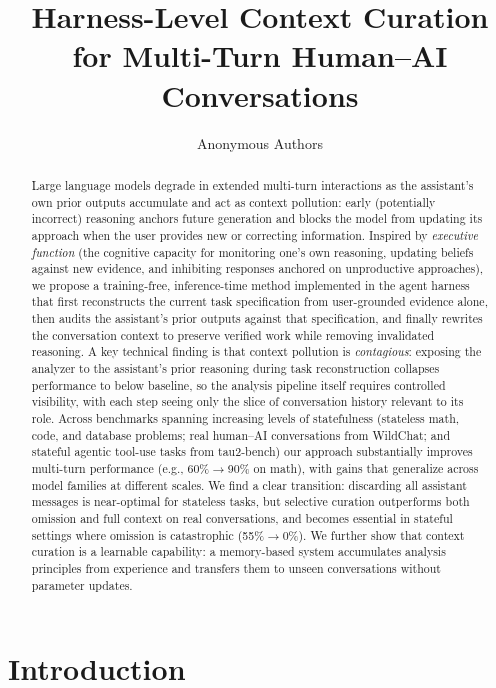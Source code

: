 \documentclass{article}
\title{Harness-Level Context Curation for Multi-Turn Human--AI Conversations}
\author{%
  Anonymous Authors
}
\begin{document}
\maketitle

\begin{abstract}
Large language models degrade in extended multi-turn interactions as the assistant's own prior outputs accumulate and act as context pollution: early (potentially incorrect) reasoning anchors future generation and blocks the model from updating its approach when the user provides new or correcting information. Inspired by \emph{executive function} (the cognitive capacity for monitoring one's own reasoning, updating beliefs against new evidence, and inhibiting responses anchored on unproductive approaches), we propose a training-free, inference-time method implemented in the agent harness that first reconstructs the current task specification from user-grounded evidence alone, then audits the assistant's prior outputs against that specification, and finally rewrites the conversation context to preserve verified work while removing invalidated reasoning. A key technical finding is that context pollution is \emph{contagious}: exposing the analyzer to the assistant's prior reasoning during task reconstruction collapses performance to below baseline, so the analysis pipeline itself requires controlled visibility, with each step seeing only the slice of conversation history relevant to its role. Across benchmarks spanning increasing levels of statefulness (stateless math, code, and database problems; real human--AI conversations from WildChat; and stateful agentic tool-use tasks from tau2-bench) our approach substantially improves multi-turn performance (e.g., 60\%$\to$90\% on math), with gains that generalize across model families at different scales. We find a clear transition: discarding all assistant messages is near-optimal for stateless tasks, but selective curation outperforms both omission and full context on real conversations, and becomes essential in stateful settings where omission is catastrophic (55\%$\to$0\%). We further show that context curation is a learnable capability: a memory-based system accumulates analysis principles from experience and transfers them to unseen conversations without parameter updates.
\end{abstract}


\section{Introduction}
\label{sec:intro}
\end{document}
